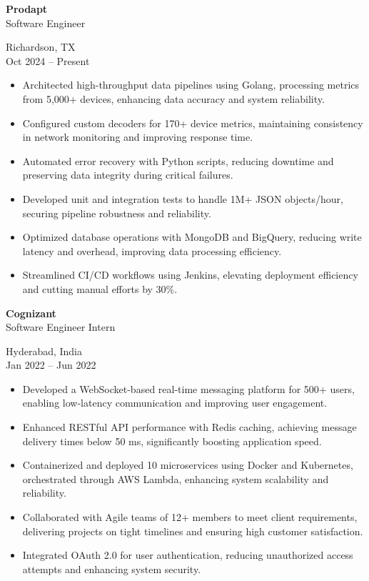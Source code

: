 \documentclass[10pt,a4paper]{article}
\newcommand{\dateplace}[2]{\raggedleft #1 \\ #2 \par}
\newcommand{\role}[2]{\raggedright \textbf{#1} \\ #2 \par}
\begin{document}
\begin{minipage}[t]{0.70\textwidth}
    \role{Prodapt}{Software Engineer}
\end{minipage}
\begin{minipage}[t]{0.29\textwidth}
    \dateplace{Richardson, TX}{Oct 2024 -- Present}
\end{minipage}
\vspace{0em}
\begin{itemize}

    \item Architected high-throughput data pipelines using Golang, processing metrics from 5,000+ devices, enhancing data accuracy and system reliability.
    \item Configured custom decoders for 170+ device metrics, maintaining consistency in network monitoring and improving response time.
    \item Automated error recovery with Python scripts, reducing downtime and preserving data integrity during critical failures.
    \item Developed unit and integration tests to handle 1M+ JSON objects/hour, securing pipeline robustness and reliability.
    \item Optimized database operations with MongoDB and BigQuery, reducing write latency and overhead, improving data processing efficiency.
    \item Streamlined CI/CD workflows using Jenkins, elevating deployment efficiency and cutting manual efforts by 30\%.
\end{itemize}
\vspace{0.5em}


\begin{minipage}[t]{0.70\textwidth}
    \role{Cognizant}{Software Engineer Intern}
\end{minipage}
\begin{minipage}[t]{0.29\textwidth}
    \dateplace{Hyderabad, India}{Jan 2022 -- Jun 2022}
\end{minipage}
\vspace{0em}
\begin{itemize}

    \item Developed a WebSocket-based real-time messaging platform for 500+ users, enabling low-latency communication and improving user engagement.
    \item Enhanced RESTful API performance with Redis caching, achieving message delivery times below 50 ms, significantly boosting application speed.
    \item Containerized and deployed 10 microservices using Docker and Kubernetes, orchestrated through AWS Lambda, enhancing system scalability and reliability.
    \item Collaborated with Agile teams of 12+ members to meet client requirements, delivering projects on tight timelines and ensuring high customer satisfaction.
    \item Integrated OAuth 2.0 for user authentication, reducing unauthorized access attempts and enhancing system security.
\end{itemize}
\vspace{0.5em}
\end{document}
